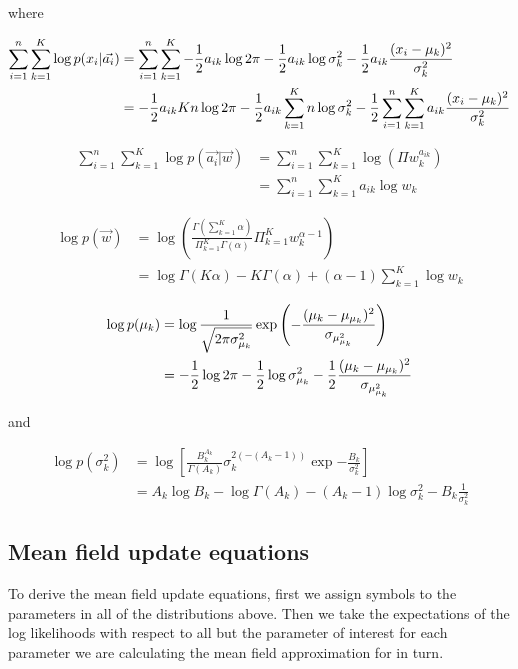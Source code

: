 \documentclass{amsart}
\begin{document}
where

\begin{align*}
\sum_{i=1}^n \sum_{k=1}^K \log{p(x_i|\vec{a_i})} &= \sum_{i=1}^n \sum_{k=1}^K - \frac{1}{2} a_{ik} \log{2 \pi} - \frac{1}{2} a_{ik} \log{\sigma_k^2} - \frac{1}{2} a_{ik} \frac{(x_i - \mu_k)^2}{\sigma_k^2} \\
&= - \frac{1}{2} a_{ik} Kn \log{2 \pi} - \frac{1}{2} a_{ik} \sum_{k=1}^K n \log{\sigma_k^2} - \frac{1}{2} \sum_{i=1}^n \sum_{k=1}^K a_{ik} \frac{(x_i - \mu_k)^2}{\sigma_k^2}
\end{align*}

\begin{align*}
\sum_{i=1}^n \sum_{k=1}^K \log{p(\vec{a_i}|\vec{w})} &= \sum_{i=1}^n \sum_{k=1}^K \log{(\Pi w_k^{a_{ik}})} \\
&= \sum_{i=1}^n \sum_{k=1}^K a_{ik} \log{w_k}
\end{align*}

\begin{align*}
\log{p(\vec{w})} &= \log{\left( \frac{\Gamma(\sum_{k=1}^K \alpha)}{\Pi_{k=1}^K \Gamma(\alpha)} \Pi_{k=1}^K w_k^{\alpha-1} \right)} \\
&= \log \Gamma(K \alpha) - K \Gamma(\alpha) + (\alpha - 1) \sum_{k=1}^K \log{w_k}
\end{align*}

\begin{align*}
\log{p(\mu_k)} &= \log{ \frac{1}{\sqrt{2 \pi \sigma_{\mu_k}^2}} \exp{\left( -\frac{(\mu_k - \mu_{\mu_k})^2}{\sigma_{\mu_{\mu_k}^2}} \right)}} \\
&= -\frac{1}{2} \log{2 \pi} - \frac{1}{2} \log{\sigma_{\mu_k}^2} - \frac{1}{2} \frac{(\mu_k - \mu_{\mu_k})^2}{\sigma_{\mu_{\mu_k}^2}}
\end{align*}

and

\begin{align*}
\log{p(\sigma_k^2)} &= \log{\left [ \frac{B_k^{A_k}}{\Gamma(A_k)} \sigma_k^{2 (-(A_k - 1))} \exp{-\frac{B_k}{\sigma_k^2}} \right ]} \\
&= A_k \log{B_k} - \log{\Gamma(A_k)} - (A_k - 1) \log{\sigma_k^2} - B_k \frac{1}{\sigma_k^2}
\end{align*}

\subsection{Mean field update equations}
To derive the mean field update equations, first we assign symbols to the parameters in all of
the distributions above. Then we take the expectations of the log likelihoods with respect
to all but the parameter of interest for each parameter we are calculating the mean field
approximation for in turn.
\end{document}
